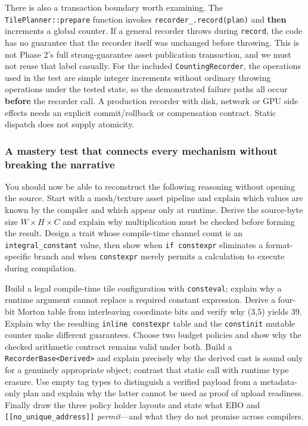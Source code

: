 There is also a transaction boundary worth examining. The \texttt{TilePlanner::prepare} function invokes \texttt{recorder\_.record(plan)} and \textbf{then} increments a global counter. If a general recorder throws during \texttt{record}, the code has no guarantee that the recorder itself was unchanged before throwing. This is not Phase 2's full strong-guarantee asset publication transaction, and we must not reuse that label casually. For the included \texttt{CountingRecorder}, the operations used in the test are simple integer increments without ordinary throwing operations under the tested state, so the demonstrated failure paths all occur \textbf{before} the recorder call. A production recorder with disk, network or GPU side effects needs an explicit commit/rollback or compensation contract. Static dispatch does not supply atomicity.

\subsubsection{A mastery test that connects every mechanism without breaking the narrative}\label{a-mastery-test-that-connects-every-mechanism-without-breaking-the-narrative}

You should now be able to reconstruct the following reasoning without opening the source. Start with a mesh/texture asset pipeline and explain which values are known by the compiler and which appear only at runtime. Derive the source-byte size \(W\times H\times C\) and explain why multiplication must be checked before forming the result. Design a trait whose compile-time channel count is an \texttt{integral\_constant} value, then show when \texttt{if\ constexpr} eliminates a format-specific branch and when \texttt{constexpr} merely permits a calculation to execute during compilation.

Build a legal compile-time tile configuration with \texttt{consteval}; explain why a runtime argument cannot replace a required constant expression. Derive a four-bit Morton table from interleaving coordinate bits and verify why (3,5) yields 39. Explain why the resulting \texttt{inline\ constexpr} table and the \texttt{constinit} mutable counter make different guarantees. Choose two budget policies and show why the checked arithmetic contract remains valid under both. Build a \texttt{RecorderBase\textless{}Derived\textgreater{}} and explain precisely why the derived cast is sound only for a genuinely appropriate object; contrast that static call with runtime type erasure. Use empty tag types to distinguish a verified payload from a metadata-only plan and explain why the latter cannot be used as proof of upload readiness. Finally draw the three policy holder layouts and state what EBO and \texttt{{[}{[}no\_unique\_address{]}{]}} \emph{permit}---and what they do not promise across compilers.

